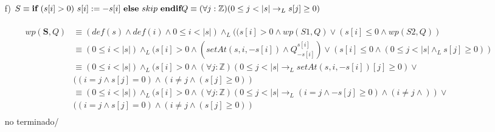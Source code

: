 \documentclass{article}
\begin{document}
{{\begin{itemize}
\begin{align}
        &\equiv (0\leq i<|s|)\land_L (s[i]<0 \land (0\leq i<|s| \land_L setAt(s,i,-s[i])[i]\geq0))\\
        &\equiv (0\leq i<|s|)\land_L (s[i]<0 \land (0\leq i<|s| \land_L -s[i]\geq0))\\
        &\equiv (0\leq i<|s|)\land_L (s[i]<0 \land (0\leq i<|s| \land_L s[i]\leq0))\\
        &\equiv (0\leq i<|s|)\\
    \end{align}
    \item [f) ]$S\equiv \textbf{if}\ (s[i]>0)\ s[i]:=-s[i]\ \textbf{else}\ skip\ \textbf{endif}\\
    Q \equiv (\forall j:\mathbb{Z})(0\leq j<|s| \to_L s[j]\geq0)$\\\\
    \setcounter{equation}{0}
    \begin{align}
        wp(\textbf{S},Q)&\equiv (def(s)\land def(i)\land 0\leq i<|s|)\land_L ((s[i]>0 
        \land wp(S1,Q)\lor(s[i]\leq0 \land wp(S2,Q))\\
        &\equiv (0\leq i<|s|)\land_L (s[i]>0 \land (setAt(s,i,-s[i])\land Q^{s[i]}_{-s[i]})\lor(s[i]\leq0 \land (0\leq j<|s| \land_L s[j]\geq0))\\
        &\equiv (0\leq i<|s|)\land_L (s[i]>0 \land (\forall j:\mathbb{Z})(0\leq j<|s| \to_L setAt(s,i,-s[i])[j]\geq0)\lor\\\nonumber
        &((i=j \land s[j]=0)\land (i\neq j \land (s[j]\geq0))\\
        &\equiv (0\leq i<|s|)\land_L (s[i]>0 \land (\forall j:\mathbb{Z})(0\leq j<|s| \to_L (i=j \land -s[j]\geq0)\land(i\neq j \land ))\lor\\\nonumber
        &((i=j \land s[j]=0)\land (i\neq j \land (s[j]\geq0))\\
    \end{align}
    no terminado/  
\end{itemize}}
}
\end{document}
